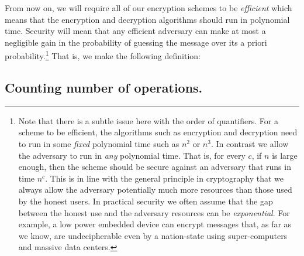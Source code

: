 From now on, we will require all of our encryption schemes to be
\emph{efficient} which means that the encryption and decryption
algorithms should run in polynomial time. Security will mean that any
efficient adversary can make at most a negligible gain in the
probability of guessing the message over its a priori
probability.\footnote{Note that there is a subtle issue here with the
  order of quantifiers. For a scheme to be efficient, the algorithms
  such as encryption and decryption need to run in some \emph{fixed}
  polynomial time such as \(n^2\) or \(n^3\). In contrast we allow the
  adversary to run in \emph{any} polynomial time. That is, for every
  \(c\), if \(n\) is large enough, then the scheme should be secure
  against an adversary that runs in time \(n^c\). This is in line with
  the general principle in cryptography that we always allow the
  adversary potentially much more resources than those used by the
  honest users. In practical security we often assume that the gap
  between the honest use and the adversary resources can be
  \emph{exponential}. For example, a low power embedded device can
  encrypt messages that, as far as we know, are undecipherable even by a
  nation-state using super-computers and massive data centers.} That is,
we make the following definition:

\hypertarget{compsecdef}{}

\subsection{Counting number of operations.}\label{countoperation}

